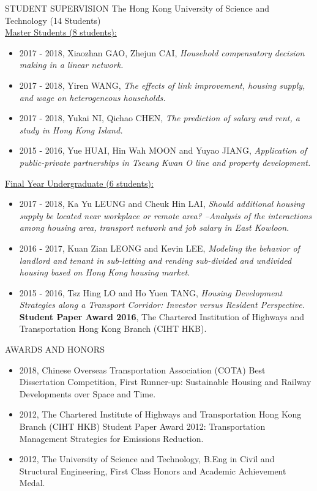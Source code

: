 \documentclass{resume} %
\begin{document}
\begin{rSection}{STUDENT SUPERVISION}
The Hong Kong University of Science and Technology (14 Students)
\vspace{6pt}\\
\underline{Master Students (8 students):}
\begin{itemize}
\item 2017 - 2018, Xiaozhan GAO, Zhejun CAI, \textit{Household compensatory
decision making in a linear network.}
\item 2017 - 2018, Yiren WANG, \textit{The effects of link improvement, housing
supply, and wage on heterogeneous households.}
\item 2017 - 2018, Yukai NI, Qichao CHEN, \textit{The prediction of salary and rent, a
study in Hong Kong Island.}
\item 2015 - 2016, Yue HUAI, Hin Wah MOON and Yuyao JIANG, \textit{Application of
public-private partnerships in Tseung Kwan O line and property development.}
\end{itemize}
\underline{Final Year Undergraduate (6 students):}
\begin{itemize}
\item 2017 - 2018, Ka Yu LEUNG and Cheuk Hin LAI, \textit{Should additional housing
supply be located near workplace or remote area? –Analysis of the interactions among housing
area, transport network and job salary in East Kowloon.}
\item 2016 - 2017, Kuan Zian LEONG and Kevin LEE, \textit{Modeling the behavior of
landlord and tenant in sub-letting and rending sub-divided and undivided housing based on
Hong Kong housing market.}
\item 2015 - 2016, Tsz Hing LO and Ho Yuen TANG, \textit{Housing Development
Strategies along a Transport Corridor: Investor versus Resident Perspective.} \textbf{Student
Paper Award 2016}, The Chartered Institution of Highways and Transportation Hong Kong
Branch (CIHT HKB).
\end{itemize}
\end{rSection}
\begin{rSection}{AWARDS AND HONORS}
\begin{itemize}
\item 2018, Chinese Overseas Transportation Association (COTA) Best
Dissertation Competition, First Runner-up: Sustainable Housing and Railway Developments
over Space and Time.
\item 2012, The Chartered Institute of Highways and Transportation Hong
Kong Branch (CIHT HKB) Student Paper Award 2012: Transportation Management Strategies
for Emissions Reduction.
\item 2012, The University of Science and Technology, B.Eng in Civil and
Structural Engineering, First Class Honors and Academic Achievement Medal.
\end{itemize}
\end{rSection}
\end{document}
